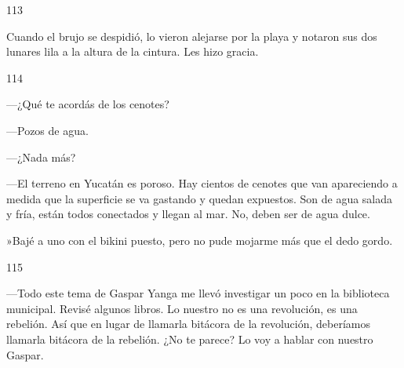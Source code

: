 \documentclass[12pt,twoside,openright,a5paper]{book}
\begin{document}
\hrulefill \hspace{0.1cm}\decofourleft\hspace{0.2cm} 113 \hspace{0.2cm}\decofourright \hspace{0.1cm}\hrulefill

\nopagebreak

\vspace{0.5cm}

\nopagebreak

Cuando el brujo se despidió, lo vieron alejarse por la playa y notaron sus dos lunares
lila a la altura de la cintura. Les hizo gracia.

\vspace{0.5cm}

\hrulefill \hspace{0.1cm}\decofourleft\hspace{0.2cm} 114 \hspace{0.2cm}\decofourright \hspace{0.1cm}\hrulefill

\nopagebreak

\vspace{0.5cm}

\nopagebreak

---¿Qué te acordás de los cenotes?

---Pozos de agua.

---¿Nada más?

---El terreno en Yucatán es poroso. Hay cientos de cenotes que van apareciendo a medida
que la superficie se va gastando y quedan expuestos. Son de agua salada
y fría, están todos conectados y llegan al mar. No, deben ser de agua
dulce.

»Bajé a uno con el bikini puesto, pero no pude mojarme más que el dedo gordo.


\vspace{0.5cm}
\afterpage{}
\hrulefill \hspace{0.1cm}\decofourleft\hspace{0.2cm} 115 \hspace{0.2cm}\decofourright \hspace{0.1cm}\hrulefill

\nopagebreak

\vspace{0.5cm}

\nopagebreak

---Todo este tema de Gaspar Yanga me llevó investigar un poco en
la biblioteca municipal. Revisé algunos libros. Lo nuestro no es
una revolución, es una rebelión. Así que en lugar de
llamarla bitácora de la revolución, deberíamos llamarla bitácora de la
rebelión. ¿No te parece? Lo voy a hablar con nuestro Gaspar.
\end{document}
